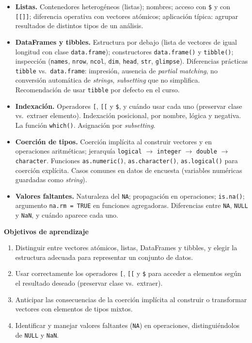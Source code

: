 \documentclass[11pt,letterpaper]{article}
\begin{document}
\begin{itemize}[leftmargin=*, itemsep=2pt]
    \item \textbf{Listas.} Contenedores heterogéneos (listas); nombres; acceso con \texttt{\$} y con \texttt{[[]]}; diferencia operativa con vectores atómicos; aplicación típica: agrupar resultados de distintos tipos de un análisis.
    \item \textbf{DataFrames y tibbles.} Estructura por debajo (lista de vectores de igual longitud con clase \texttt{data.frame}); constructores \texttt{data.frame()} y \texttt{tibble()}; inspección (\texttt{names}, \texttt{nrow}, \texttt{ncol}, \texttt{dim}, \texttt{head}, \texttt{str}, \texttt{glimpse}). Diferencias prácticas \texttt{tibble} vs.\ \texttt{data.frame}: impresión, ausencia de \textit{partial matching}, no conversión automática de \textit{strings}, \textit{subsetting} que no simplifica. Recomendación de usar \texttt{tibble} por defecto en el curso.
    \item \textbf{Indexación.} Operadores \texttt{[}, \texttt{[[} y \texttt{\$}, y cuándo usar cada uno (preservar clase vs.\ extraer elemento). Indexación posicional, por nombre, lógica y negativa. La función \texttt{which()}. Asignación por \textit{subsetting}.
    \item \textbf{Coerción de tipos.} Coerción implícita al construir vectores y en operaciones aritméticas; jerarquía \texttt{logical} $\to$ \texttt{integer} $\to$ \texttt{double} $\to$ \texttt{character}. Funciones \texttt{as.numeric()}, \texttt{as.character()}, \texttt{as.logical()} para coerción explícita. Casos comunes en datos de encuesta (variables numéricas guardadas como \textit{string}).
    \item \textbf{Valores faltantes.} Naturaleza del \texttt{NA}; propagación en operaciones; \texttt{is.na()}; argumento \texttt{na.rm = TRUE} en funciones agregadoras. Diferencias entre \texttt{NA}, \texttt{NULL} y \texttt{NaN}, y cuándo aparece cada uno.
\end{itemize}

\medskip
\noindent\textbf{Objetivos de aprendizaje}
\begin{enumerate}[leftmargin=*, itemsep=1pt]
    \item Distinguir entre vectores atómicos, listas, DataFrames y tibbles, y elegir la estructura adecuada para representar un conjunto de datos.
    \item Usar correctamente los operadores \texttt{[}, \texttt{[[} y \texttt{\$} para acceder a elementos según el resultado deseado (preservar clase vs.\ extraer).
    \item Anticipar las consecuencias de la coerción implícita al construir o transformar vectores con elementos de tipos mixtos.
    \item Identificar y manejar valores faltantes (\texttt{NA}) en operaciones, distinguiéndolos de \texttt{NULL} y \texttt{NaN}.
\end{enumerate}
\end{document}
